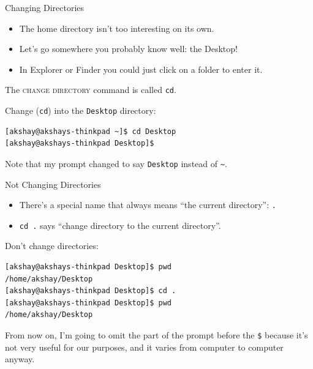 \begin{frame}[fragile]{Changing Directories}
  \begin{itemize}
    \item
      The home directory isn't too interesting on its own.
    \item
      Let's go somewhere you probably know well: the Desktop!
    \item
      In Explorer or Finder you could just click on a folder to enter it.
  \end{itemize}
  \pause
  \alert<2>{The \textsc{change directory} command is called \texttt{cd}.}
  \pause
  \begin{example}[cd]
    Change (\texttt{cd}) into the \texttt{Desktop} directory:
    \begin{verbatim}
[akshay@akshays-thinkpad ~]$ cd Desktop
[akshay@akshays-thinkpad Desktop]$
    \end{verbatim}
  \end{example}
   {
    Note that my prompt changed to say \texttt{Desktop} instead of
    \texttt{\textasciitilde}.
  }
\end{frame}

\begin{frame}[fragile]{Not Changing Directories}
  \begin{itemize}
  \item
    There's a special name that always means \enquote{the current directory}: \texttt{.}
  \item
    \texttt{cd .} says \enquote{change directory to the current directory}.
  \end{itemize}
  \pause
  \begin{example}[cd .]
    Don't change directories:
    \begin{verbatim}
[akshay@akshays-thinkpad Desktop]$ pwd
/home/akshay/Desktop
[akshay@akshays-thinkpad Desktop]$ cd .
[akshay@akshays-thinkpad Desktop]$ pwd
/home/akshay/Desktop
    \end{verbatim}
  \end{example}
   {
    From now on, I'm going to omit the part of the prompt before the
    \texttt{\$} because it's not very useful for our purposes, and it varies
    from computer to computer anyway.
  }
\end{frame}

